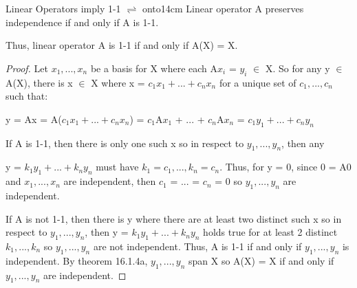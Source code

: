     \vspace{0.5cm}



    \begin{wtheorem}{Linear Operators imply 1-1 $\rightleftharpoons$ onto}{14cm}
        Linear operator A preserves independence if and only if A is 1-1.

        Thus, linear operator A is 1-1 if and only if A(X) = X.
    \end{wtheorem}

    \begin{proof}
        Let $x_1,...,x_n$ be a basis for X where each A$x_i$ = $y_i$ $\in$ X.
        So for any y $\in$ A(X), there is x $\in$ X where
        x = $c_1x_1 + ... + c_nx_n$ for a unique set of $c_1,...,c_n$
        such that:

        \hspace{0.5cm}
        y = Ax = A($c_1x_1 + ... + c_nx_n$)
        = $c_1$A$x_1$ + ... + $c_n$A$x_n$
        = $c_1y_1 + ... + c_ny_n$

        If A is 1-1, then there is only one such x so
        in respect to $y_1,...,y_n$, then any

        y = $k_1y_1 + ... + k_ny_n$
        must have $k_1 = c_1, ... , k_n = c_n$.
        Thus, for y = 0, since 0 = A0 and $x_1,...,x_n$ are independent,
        then $c_1$ = ... = $c_n$ = 0 so $y_1,...,y_n$ are independent.
        
        If A is not 1-1, then there is y where there are at least two distinct
        such x so in respect to $y_1,...,y_n$, then y = $k_1y_1 + ... + k_ny_n$
        holds true for at least 2 distinct $k_1,...,k_n$ so
        $y_1,...,y_n$ are not independent.
        Thus, A is 1-1 if and only if $y_1,...,y_n$ is independent.
        By {\color{red} theorem 16.1.4a}, $y_1,...,y_n$ span X
        so A(X) = X if and only if $y_1,...,y_n$ are independent.
    \end{proof}

    \newpage



